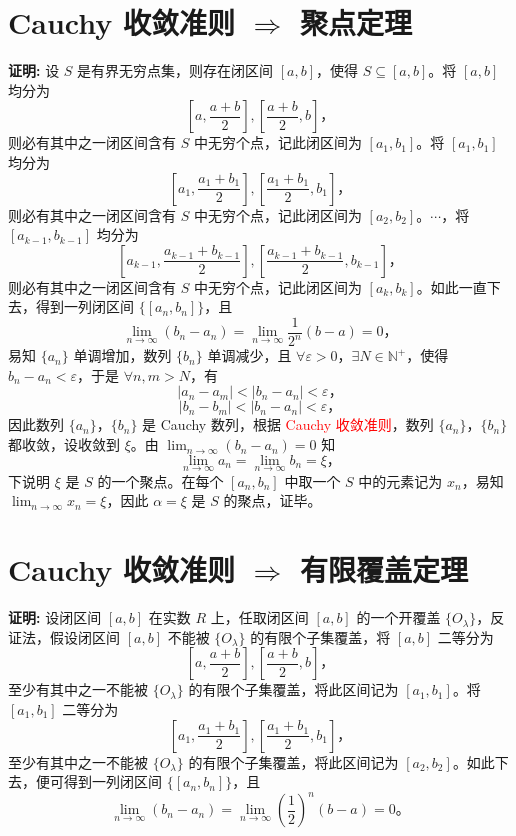 \documentclass[lang=cn,newtx,10pt,scheme=chinese]{elegantbook}
\begin{document}
\section*{Cauchy 收敛准则 $\Rightarrow$ 聚点定理}

\textbf{证明:} 设 $S$ 是有界无穷点集，则存在闭区间 $[a, b]$，使得 $S \subseteq [a, b]$。将 $[a, b]$ 均分为
\[
\left[ a, \frac{a + b}{2} \right], \left[ \frac{a + b}{2}, b \right]，
\]
则必有其中之一闭区间含有 $S$ 中无穷个点，记此闭区间为 $[a_1, b_1]$。将 $[a_1, b_1]$ 均分为
\[
\left[ a_1, \frac{a_1 + b_1}{2} \right], \left[ \frac{a_1 + b_1}{2}, b_1 \right]，
\]
则必有其中之一闭区间含有 $S$ 中无穷个点，记此闭区间为 $[a_2, b_2]$。$\cdots$，将 $[a_{k-1}, b_{k-1}]$ 均分为
\[
\left[ a_{k-1}, \frac{a_{k-1} + b_{k-1}}{2} \right], \left[ \frac{a_{k-1} + b_{k-1}}{2}, b_{k-1} \right]，
\]
则必有其中之一闭区间含有 $S$ 中无穷个点，记此闭区间为 $[a_k, b_k]$。如此一直下去，得到一列闭区间 $\{[a_n, b_n]\}$，且
\[
\lim_{n \to \infty} (b_n - a_n) = \lim_{n \to \infty} \frac{1}{2^n} (b - a) = 0，
\]
易知 $\{a_n\}$ 单调增加，数列 $\{b_n\}$ 单调减少，且 $\forall \varepsilon > 0$，$\exists N \in \mathbb{N}^+$，使得 $b_n - a_n < \varepsilon$，于是 $\forall n, m > N$，有
\[
|a_n - a_m| < |b_n - a_n| < \varepsilon，
\]
\[
|b_n - b_m| < |b_n - a_n| < \varepsilon，
\]
因此数列 $\{a_n\}$，$\{b_n\}$ 是 Cauchy 数列，根据 \textcolor{red}{Cauchy 收敛准则}，数列 $\{a_n\}$，$\{b_n\}$ 都收敛，设收敛到 $\xi$。由 $\lim_{n \to \infty} (b_n - a_n) = 0$ 知
\[
\lim_{n \to \infty} a_n = \lim_{n \to \infty} b_n = \xi，
\]
下说明 $\xi$ 是 $S$ 的一个聚点。在每个 $[a_n, b_n]$ 中取一个 $S$ 中的元素记为 $x_n$，易知 $\lim_{n \to \infty} x_n = \xi$，因此 $\alpha = \xi$ 是 $S$ 的聚点，证毕。

\section*{Cauchy 收敛准则 $\Rightarrow$ 有限覆盖定理}

\textbf{证明:} 设闭区间 $[a, b]$ 在实数 $R$ 上，任取闭区间 $[a, b]$ 的一个开覆盖 $\{O_{\lambda}\}$，反证法，假设闭区间 $[a, b]$ 不能被 $\{O_{\lambda}\}$ 的有限个子集覆盖，将 $[a, b]$ 二等分为
\[
\left[ a, \frac{a + b}{2} \right], \left[ \frac{a + b}{2}, b \right]，
\]
至少有其中之一不能被 $\{O_{\lambda}\}$ 的有限个子集覆盖，将此区间记为 $[a_1, b_1]$。将 $[a_1, b_1]$ 二等分为
\[
\left[ a_1, \frac{a_1 + b_1}{2} \right], \left[ \frac{a_1 + b_1}{2}, b_1 \right]，
\]
至少有其中之一不能被 $\{O_{\lambda}\}$ 的有限个子集覆盖，将此区间记为 $[a_2, b_2]$。如此下去，便可得到一列闭区间 $\{[a_n, b_n]\}$，且
\[
\lim_{n \to \infty} (b_n - a_n) = \lim_{n \to \infty} \left(\frac{1}{2}\right)^n (b - a) = 0。
\]
\end{document}
